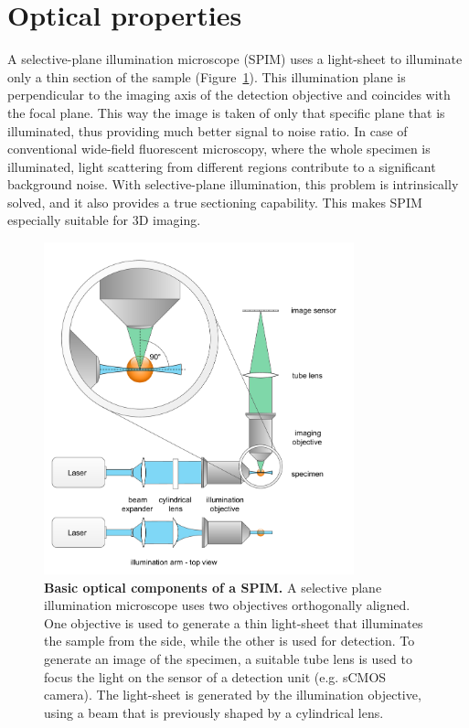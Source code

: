 \documentclass{tdk_style}
\begin{document}
\section{Optical properties}

A selective-plane illumination microscope (SPIM) uses a light-sheet to illuminate only a thin section of the sample (Figure~\ref{fig:light-sheet}). This illumination plane is perpendicular to the imaging axis of the detection objective and coincides with the focal plane. This way the image is taken of only that specific plane that is illuminated, thus providing much better signal to noise ratio. In case of conventional wide-field fluorescent microscopy, where the whole specimen is illuminated, light scattering from different regions contribute to a significant background noise. With selective-plane illumination, this problem is intrinsically solved, and it also provides a true sectioning capability. This makes SPIM especially suitable for 3D imaging.



\begin{figure}[htpb]
	\centering
	\includegraphics[width=0.8\textwidth]{figures/2_spim/light-sheet}
	\caption{\textbf{Basic optical components of a SPIM.} A selective plane illumination microscope uses two objectives orthogonally aligned. One objective is used to generate a thin light-sheet that illuminates the sample from the side, while the other is used for detection. To generate an image of the specimen, a suitable tube lens is used to focus the light on the sensor of a detection unit (e.g. sCMOS camera). The light-sheet is generated by the illumination objective, using a beam that is previously shaped by a cylindrical lens.}
	\label{fig:light-sheet}
\end{figure}
\end{document}
